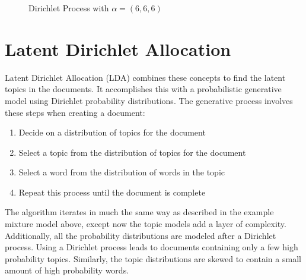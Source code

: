 \begin{figure}
\begin{centering}

\caption{Dirichlet Process with $\alpha = (6,6,6)$}
\label{figure:dirichlet6}
\end{centering}
\end{figure}

\section{Latent Dirichlet Allocation}
Latent Dirichlet Allocation (LDA) combines these concepts to find the latent topics in the documents.  It accomplishes this with a probabilistic generative model using Dirichlet probability distributions.  The generative process involves these steps when creating a document:
\begin{enumerate}
\item{Decide on a distribution of topics for the document}
\item{Select a topic from the distribution of topics for the document}
\item{Select a word from the distribution of words in the topic}
\item{Repeat this process until the document is complete}
\end{enumerate}

The algorithm iterates in much the same way as described in the example mixture model above, except now the topic models add a layer of complexity.  Additionally, all the probability distributions are modeled after a Dirichlet process.  Using a Dirichlet process leads to documents containing only a few high probability topics.  Similarly, the topic distributions are skewed to contain a small amount of high probability words.


